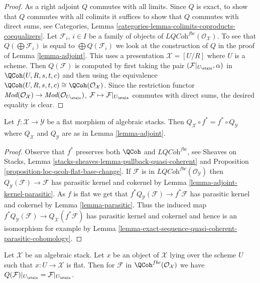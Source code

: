 \begin{proof}
\medskip\noindent
As a right adjoint $Q$ commutes with all limits. Since $Q$ is exact, to
show that $Q$ commutes with all colimits it suffices to show that $Q$
commutes with direct sums, see
Categories, Lemma \ref{categories-lemma-colimits-coproducts-coequalizers}.
Let $\mathcal{F}_i$, $i \in I$ be a family of objects of
$\textit{LQCoh}^{fbc}(\mathcal{O}_\mathcal{X})$. To see that
$Q(\bigoplus \mathcal{F}_i)$ is equal to $\bigoplus Q(\mathcal{F}_i)$
we look at the construction of $Q$ in the proof of
Lemma \ref{lemma-adjoint}. This uses a presentation $\mathcal{X} = [U/R]$
where $U$ is a scheme. Then $Q(\mathcal{F})$
is computed by first taking the pair
$(\mathcal{F}|_{U_\etale}, \alpha)$ in $\QCoh(U, R, s, t, c)$
and then using the equivalence
$\QCoh(U, R, s, t, c) \cong \QCoh(\mathcal{O}_\mathcal{X})$.
Since the restriction functor $\textit{Mod}(\mathcal{O}_\mathcal{X}) \to
\textit{Mod}(\mathcal{O}_{U_\etale})$,
$\mathcal{F} \mapsto \mathcal{F}|_{U_\etale}$ commutes with
direct sums, the desired equality is clear.
\end{proof}

\begin{lemma}
\label{lemma-flat-morphism-and-Q}
Let $f : \mathcal{X} \to \mathcal{Y}$ be a flat morphism of algebraic stacks.
Then $Q_\mathcal{X} \circ f^* = f^* \circ Q_\mathcal{Y}$ where
$Q_\mathcal{X}$ and $Q_\mathcal{Y}$ are as in Lemma \ref{lemma-adjoint}.
\end{lemma}

\begin{proof}
Observe that $f^*$ preserves both $\QCoh$ and $\textit{LQCoh}^{fbc}$,
see Sheaves on Stacks, Lemma
\ref{stacks-sheaves-lemma-pullback-quasi-coherent} and
Proposition \ref{proposition-loc-qcoh-flat-base-change}.
If $\mathcal{F}$ is in $\textit{LQCoh}^{fbc}(\mathcal{O}_\mathcal{Y})$
then $Q_\mathcal{Y}(\mathcal{F}) \to \mathcal{F}$
has parasitic kernel and cokernel
by Lemma \ref{lemma-adjoint-kernel-parasitic}.
As $f$ is flat we get that $f^*Q_\mathcal{Y}(\mathcal{F}) \to f^*\mathcal{F}$
has parasitic kernel and cokernel by
Lemma \ref{lemma-parasitic}.
Thus the induced map
$f^*Q_\mathcal{Y}(\mathcal{F}) \to Q_\mathcal{X}(f^*\mathcal{F})$
has parasitic kernel and cokernel and hence is an isomorphism
for example by
Lemma \ref{lemma-exact-sequence-quasi-coherent-parasitic-cohomology}.
\end{proof}

\begin{lemma}
\label{lemma-flat-object-and-Q}
Let $\mathcal{X}$ be an algebraic stack. Let $x$ be an object of $\mathcal{X}$
lying over the scheme $U$ such that $x : U \to \mathcal{X}$ is flat.
Then for $\mathcal{F}$ in $\QCoh^{fbc}(\mathcal{O}_\mathcal{X})$
we have $Q(\mathcal{F})|_{U_\etale} = \mathcal{F}|_{U_\etale}$.
\end{lemma}

